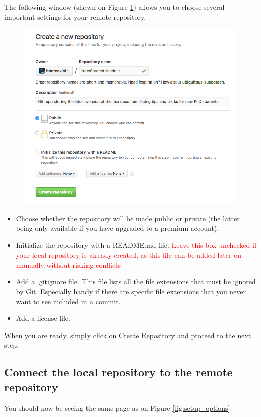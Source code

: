 \documentclass{report}
\begin{document}
The following window (shown on Figure \ref{fig:new_repo_settings}) allows you to choose several important settings for your remote repository.
\begin{figure}[H]
\centering
\includegraphics[scale=0.6]{new_repo_settings}
\label{fig:new_repo_settings}
\end{figure}

\begin{itemize}
\item Choose whether the repository will be made public or private (the latter being only available if you have upgraded to a premium account).
\item Initialize the repository with a README.md file. \textcolor{red}{Leave this box unchecked if your local repository is already created, as this file can be added later on manually without risking conflicts} 
\item Add a .gitignore file. This file lists all the file extensions that must be ignored by Git. Especially handy if there are specific file extensions that you never want to see included in a commit.
\item Add a license file.
\end{itemize}
When you are ready, simply click on Create Repository and proceed to the next step.
\subsection{Connect the local repository to the remote repository}
You should now be seeing the same page as on Figure \ref{fig:setup_options}. 
\end{document}
